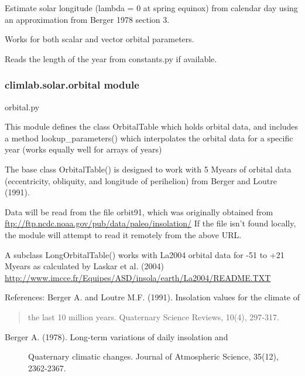 \documentclass[letterpaper,10pt,english]{sphinxmanual}
\begin{document}

\begin{fulllineitems}
\label{api/climlab.solar:climlab.solar.insolation.solar_longitude}
Estimate solar longitude (lambda = 0 at spring equinox) from calendar day 
using an approximation from Berger 1978 section 3.

Works for both scalar and vector orbital parameters.

Reads the length of the year from constants.py if available.

\end{fulllineitems}



\subsubsection{climlab.solar.orbital module}
\label{api/climlab.solar:module-climlab.solar.orbital}\label{api/climlab.solar:climlab-solar-orbital-module}
orbital.py

This module defines the class OrbitalTable which holds orbital data,
and includes a method lookup\_parameters() 
which interpolates the orbital data for a specific year
(works equally well for arrays of years)

The base class OrbitalTable() is designed to work with 5 Myears of orbital data
(eccentricity, obliquity, and longitude of perihelion) 
from Berger and Loutre (1991).

Data will be read from the file orbit91, which was originally obtained from
\href{ftp://ftp.ncdc.noaa.gov/pub/data/paleo/insolation/}{ftp://ftp.ncdc.noaa.gov/pub/data/paleo/insolation/}
If the file isn't found locally, the module will attempt to read it remotely
from the above URL.

A subclass LongOrbitalTable() works with La2004 orbital data for -51 to +21 Myears
as calculated by Laskar et al. (2004)
\href{http://www.imcce.fr/Equipes/ASD/insola/earth/La2004/README.TXT}{http://www.imcce.fr/Equipes/ASD/insola/earth/La2004/README.TXT}

References: 
Berger A. and Loutre M.F. (1991). Insolation values for the climate of
\begin{quote}

the last 10 million years. Quaternary Science Reviews, 10(4), 297-317.
\end{quote}
\begin{description}
\item[{Berger A. (1978). Long-term variations of daily insolation and}] \leavevmode
Quaternary climatic changes. Journal of Atmospheric Science, 35(12),
2362-2367.

\end{description}
\end{document}
